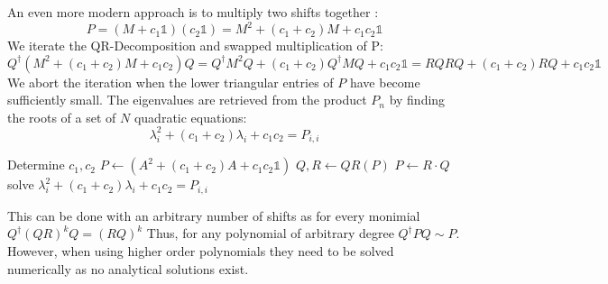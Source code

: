 \documentclass[Master]{subfiles}
\begin{document}
An even more modern approach is to multiply two shifts together \cite{braman2002multishift}:
$$P = (M + c_1 \mathbb{1})(c_2 \mathbb{1}) = M^2 + (c_1+c_2) M + c_1 c_2 \mathbb{1}$$
We iterate the QR-Decomposition and swapped multiplication of P:
$$Q^{\dag} ( M^2 + (c_1+c_2) M + c_1 c_2) Q = Q^{\dag} M^2 Q + (c_1+c_2) Q^{\dag} M Q+ c_1 c_2 \mathbb{1} =  R Q R Q + (c_1+c_2) R Q+ c_1 c_2 \mathbb{1}$$
We abort the iteration when the lower triangular entries of $P$ have become sufficiently small.
The eigenvalues are retrieved from the product $P_n$ by finding the roots of a set of $N$ quadratic equations:
$$
 \lambda_i^2 + (c_1+c_2)\lambda_i + c_1 c_2 = P_{i,i}
$$

\begin{algorithm}[H]
\caption{QR-Algorithm with two Shifts}\label{num:QRShift2}
\begin{algorithmic}[1]
\Procedure{}{}
\State Determine $c_1,c_2$
\State $P \gets (A^2 + (c_1+c_2)A + c_1 c_2 \mathbb{1})$
 
\State $Q,R \gets QR(P)$ 
\State $P \gets R \cdot Q$
\EndWhile
\State solve $\lambda_i^2 + (c_1+c_2)\lambda_i + c_1 c_2 = P_{i,i}$  
\EndProcedure
\end{algorithmic}
\end{algorithm}
This can be done with an arbitrary number of shifts as for every monimial $Q^{\dag}(QR)^k Q = (RQ)^k$ Thus, for any polynomial of arbitrary degree $Q^{\dag}PQ \sim P$. However, when using higher order polynomials they need to be solved numerically as no analytical solutions exist.
\end{document}
